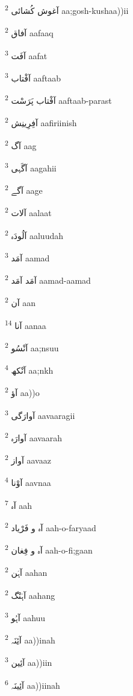 \documentclass[12pt]{article}
\begin{document}
\begin{multicols}{5}
{\ur آغوش کُشائی}   \textsuperscript{2} aa;gosh-kushaa))ii

{\ur آفاق}   \textsuperscript{2} aafaaq

{\ur آفَت}   \textsuperscript{3} aafat

{\ur آفْتاب}   \textsuperscript{3} aaftaab

{\ur آفْتاب پَرَسْت}   \textsuperscript{2} aaftaab-parast

{\ur آفِرِینِش}   \textsuperscript{2} aafiriinish

{\ur آگ}   \textsuperscript{2} aag

{\ur آگَہی}   \textsuperscript{3} aagahii

{\ur آگے}   \textsuperscript{2} aage

{\ur آلات}   \textsuperscript{2} aalaat

{\ur آلُودَہ}   \textsuperscript{2} aaluudah

{\ur آمَد}   \textsuperscript{3} aamad

{\ur آمَد آمَد}   \textsuperscript{2} aamad-aamad

{\ur آن}   \textsuperscript{2} aan

{\ur آنا}   \textsuperscript{14} aanaa

{\ur آنْسُو}   \textsuperscript{2} aa;nsuu

{\ur آنْکھ}   \textsuperscript{4} aa;nkh

{\ur آؤ}   \textsuperscript{2} aa))o

{\ur آوارَگی}   \textsuperscript{3} aavaaragii

{\ur آوارَہ}   \textsuperscript{2} aavaarah

{\ur آواز}   \textsuperscript{2} aavaaz

{\ur آوْنا}   \textsuperscript{4} aavnaa

{\ur آہ}   \textsuperscript{7} aah

{\ur آہ و فَرْیاد}   \textsuperscript{2} aah-o-faryaad

{\ur آہ و فِغان}   \textsuperscript{2} aah-o-fi;gaan

{\ur آہَن}   \textsuperscript{2} aahan

{\ur آہَنْگ}   \textsuperscript{2} aahang

{\ur آہُو}   \textsuperscript{3} aahuu

{\ur آئِنَہ}   \textsuperscript{2} aa))inah

{\ur آئِین}   \textsuperscript{3} aa))iin

{\ur آئِینَہ}   \textsuperscript{6} aa))iinah


\end{multicols}
\end{document}
